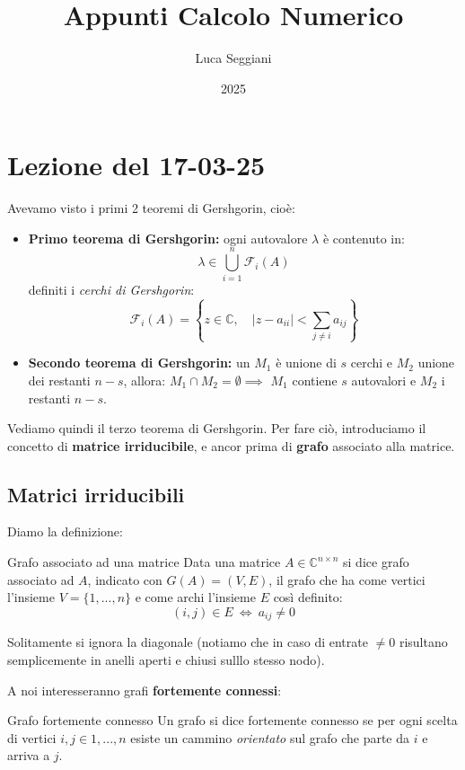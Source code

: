 \documentclass[a4paper,11pt]{article}
\title{Appunti Calcolo Numerico}
\author{Luca Seggiani}
\date{2025}
\begin{document}
\section{Lezione del 17-03-25}

\thispagestyle{empty}
\pagestyle{fancy}

Avevamo visto i primi 2 teoremi di Gershgorin, cioè:
\begin{itemize}
	\item \textbf{Primo teorema di Gershgorin:} ogni autovalore $\lambda$ è contenuto in:
		$$
			\lambda \in \bigcup_{i=1}^n \mathcal{F}_i(A)
		$$
		definiti i \textit{cerchi di Gershgorin}:
		$$
			\mathcal{F}_i(A) = \left\{ z \in \mathbb{C}, \quad |z - a_{ii}| < \sum_{j \neq i} a_{ij} \right\}
		$$
		
	\item \textbf{Secondo teorema di Gershgorin:} un $M_1$ è unione di $s$ cerchi e $M_2$ unione dei restanti $n - s$, allora:
		$
			M_1 \cap M_2 = \emptyset \implies
		$
		$M_1$ contiene $s$ autovalori e $M_2$ i restanti $n - s$.
\end{itemize}

Vediamo quindi il terzo teorema di Gershgorin.
Per fare ciò, introduciamo il concetto di \textbf{matrice irriducibile}, e ancor prima di \textbf{grafo} associato alla matrice.

\subsection{Matrici irriducibili}
Diamo la definizione:
\begin{definition}{Grafo associato ad una matrice}
	Data una matrice $A \in \mathbb{C}^{n \times n}$ si dice grafo associato ad $A$, indicato con $G(A) = (V, E)$, il grafo che ha come vertici l'insieme $V = \{ 1, ..., n \}$ e come archi l'insieme $E$ così definito:
	$$
		(i, j) \in E \ \Leftrightarrow \ a_{ij} \neq 0
	$$
\end{definition}

Solitamente si ignora la diagonale (notiamo che in caso di entrate $\neq 0$ risultano semplicemente in anelli aperti e chiusi sulllo stesso nodo).

A noi interesseranno grafi \textbf{fortemente connessi}:
\begin{definition}{Grafo fortemente connesso}
	Un grafo si dice fortemente connesso se per ogni scelta di vertici $i, j \in 1, ..., n$ esiste un cammino \textit{orientato} sul grafo che parte da $i$ e arriva a $j$.
\end{definition}
\end{document}

